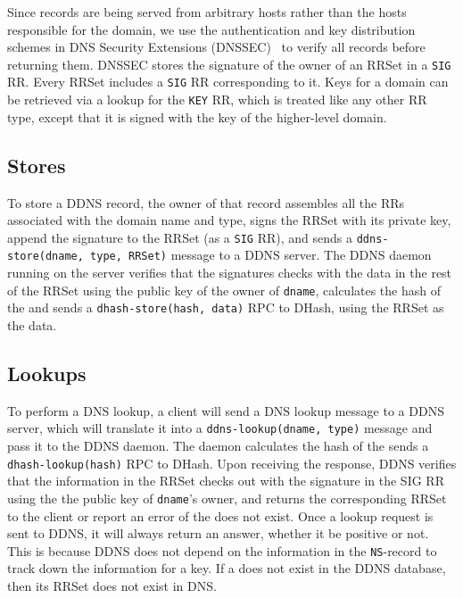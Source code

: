 Since records are being served from arbitrary hosts rather
than the hosts responsible for the domain, 
we use the authentication and key distribution schemes in 
DNS Security Extensions (DNSSEC)~\cite{dnssec:rfc} to
verify all records before returning them. DNSSEC stores the 
signature of the owner of an RRSet in a {\tt SIG} RR. Every RRSet
includes a {\tt SIG} RR corresponding to it. Keys for a domain can 
be retrieved via a lookup for the {\tt KEY} RR, which is treated 
like any other RR type, except that it is signed with the 
key of the higher-level domain.

\subsection{Stores}

To store a DDNS record, the owner of that record 
assembles all the RRs associated with the domain name and type, 
signs the RRSet with its private key, append the signature to 
the RRSet (as a {\tt SIG} RR),
and sends a {\tt ddns-store(dname, type, RRSet)} message to a 
DDNS server.
The DDNS daemon running on the server verifies that 
the signatures checks with the data in the 
rest of the RRSet using the public key of the owner of {\tt dname},
calculates the hash of the {\tt <dname, type>} and sends
a {\tt dhash-store(hash, data)} RPC to DHash, using the
RRSet as the data. 

\subsection{Lookups}

To perform a DNS lookup, a client will send a 
DNS lookup message to a DDNS server, which will 
translate it into a
{\tt ddns-lookup(dname, type)} message and pass it 
to the DDNS daemon.
The daemon 
calculates the hash of the {\tt <dname, type>} sends a
{\tt dhash-lookup(hash)} RPC to DHash. Upon receiving
the response, DDNS verifies that the information in the RRSet 
checks out with the signature in the SIG RR using the 
the public key of {\tt dname}'s owner, and
returns the corresponding RRSet to the 
client or report an error of the {\tt <dname, type>} does 
not exist. Once a lookup request is sent to DDNS, it will 
always return an answer, whether it be positive or not. 
This is because DDNS does not depend on the information 
in the {\tt NS}-record to track down the information for a key.
If a {\tt <dname, type>} does not exist in the DDNS database,
then its RRSet does not exist in DNS. 

